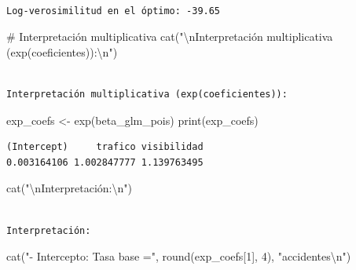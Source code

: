 \documentclass[
  letterpaper,
  DIV=11,
  numbers=noendperiod]{scrreprt}
\newenvironment{Shaded}{\begin{snugshade}}{\end{snugshade}}
\newcommand{\CommentTok}[1]{\textcolor[rgb]{0.37,0.37,0.37}{#1}}
\newcommand{\DecValTok}[1]{\textcolor[rgb]{0.68,0.00,0.00}{#1}}
\newcommand{\FunctionTok}[1]{\textcolor[rgb]{0.28,0.35,0.67}{#1}}
\newcommand{\NormalTok}[1]{\textcolor[rgb]{0.00,0.23,0.31}{#1}}
\newcommand{\OtherTok}[1]{\textcolor[rgb]{0.00,0.23,0.31}{#1}}
\newcommand{\SpecialCharTok}[1]{\textcolor[rgb]{0.37,0.37,0.37}{#1}}
\newcommand{\StringTok}[1]{\textcolor[rgb]{0.13,0.47,0.30}{#1}}
\begin{document}
\begin{tcolorbox}
\begin{verbatim}

Log-verosimilitud en el óptimo: -39.65 
\end{verbatim}

\begin{Shaded}
\begin{Highlighting}[]
\CommentTok{\# Interpretación multiplicativa}
\FunctionTok{cat}\NormalTok{(}\StringTok{"}\SpecialCharTok{\textbackslash{}n}\StringTok{Interpretación multiplicativa (exp(coeficientes)):}\SpecialCharTok{\textbackslash{}n}\StringTok{"}\NormalTok{)}
\end{Highlighting}
\end{Shaded}

\begin{verbatim}

Interpretación multiplicativa (exp(coeficientes)):
\end{verbatim}

\begin{Shaded}
\begin{Highlighting}[]
\NormalTok{exp\_coefs }\OtherTok{\textless{}{-}} \FunctionTok{exp}\NormalTok{(beta\_glm\_pois)}
\FunctionTok{print}\NormalTok{(exp\_coefs)}
\end{Highlighting}
\end{Shaded}

\begin{verbatim}
(Intercept)     trafico visibilidad 
0.003164106 1.002847777 1.139763495 
\end{verbatim}

\begin{Shaded}
\begin{Highlighting}[]
\FunctionTok{cat}\NormalTok{(}\StringTok{"}\SpecialCharTok{\textbackslash{}n}\StringTok{Interpretación:}\SpecialCharTok{\textbackslash{}n}\StringTok{"}\NormalTok{)}
\end{Highlighting}
\end{Shaded}

\begin{verbatim}

Interpretación:
\end{verbatim}

\begin{Shaded}
\begin{Highlighting}[]
\FunctionTok{cat}\NormalTok{(}\StringTok{"{-} Intercepto: Tasa base ="}\NormalTok{, }\FunctionTok{round}\NormalTok{(exp\_coefs[}\DecValTok{1}\NormalTok{], }\DecValTok{4}\NormalTok{), }\StringTok{"accidentes}\SpecialCharTok{\textbackslash{}n}\StringTok{"}\NormalTok{)}
\end{Highlighting}
\end{Shaded}


\end{tcolorbox}
\end{document}
